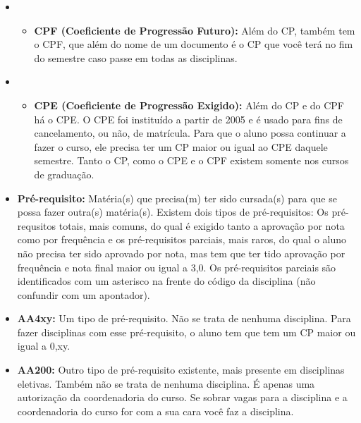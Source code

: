 \begin{itemize}
\item \begin{itemize}
\item  \textbf{CPF (Coeficiente de Progressão Futuro):} Além do CP, também tem o CPF, que além do nome de um documento é o CP que você terá no fim do semestre caso passe em todas as disciplinas.
\end{itemize}
\end{itemize}

\begin{itemize}
\item \begin{itemize}
\item  \textbf{CPE (Coeficiente de Progressão Exigido):} Além do CP e do CPF há o CPE. O CPE foi instituído a partir de 2005 e é usado para fins de cancelamento, ou não, de matrícula. Para que o aluno possa continuar a fazer o curso, ele precisa ter um CP maior ou igual ao CPE daquele semestre. Tanto o CP, como o CPE e o CPF existem somente nos cursos de graduação.
\end{itemize}
\end{itemize}

\begin{itemize}
\item  \textbf{Pré-requisito:} Matéria(s) que precisa(m) ter sido cursada(s) para que se possa fazer outra(s) matéria(s). Existem dois tipos de pré-requisitos: Os pré-requsitos totais, mais comuns, do qual é exigido tanto a aprovação por nota como por frequência e os pré-requisitos parciais, mais raros, do qual o aluno não precisa ter sido aprovado por nota, mas tem que ter tido aprovação por frequência e nota final maior ou igual a 3,0. Os pré-requisitos parciais são identificados com um asterisco na frente do código da disciplina (não confundir com um apontador).
\end{itemize}

\begin{itemize}
\item  \textbf{AA4xy:} Um tipo de pré-requisito. Não se trata de nenhuma disciplina. Para fazer disciplinas com esse pré-requisito, o aluno tem que tem um CP maior ou igual a 0,xy.
\end{itemize}

\begin{itemize}
\item  \textbf{AA200:} Outro tipo de pré-requisito existente, mais presente em disciplinas eletivas. Também não se trata de nenhuma disciplina. É apenas uma autorização da coordenadoria do curso. Se sobrar vagas para a disciplina e a coordenadoria do curso for com a sua cara você faz a disciplina.
\end{itemize}

